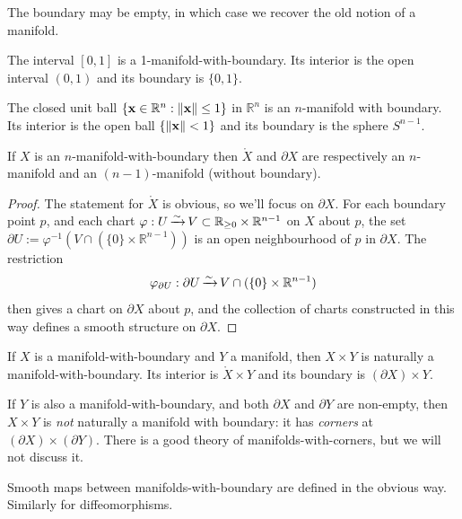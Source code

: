 \documentclass[a4paper,11pt]{article}
\begin{document}
	\begin{rmk}
		The boundary may be empty, in which case we recover the old notion of a manifold.
	\end{rmk}

	\begin{ex}
		The interval $[0,1]$ is a 1-manifold-with-boundary. Its interior is the open interval $(0,1)$ and its boundary is $\{0,1\}$.
	\end{ex}

	\begin{ex}
		The closed unit ball $\{\vb x \in \mathbb{R}^n : \norm{\vb x} \leq 1\}$ in $\mathbb{R}^n$ is an $n$-manifold with boundary. Its interior is the open ball $\{\norm{\vb x}<1\}$ and its boundary is the sphere $S ^{n-1}$.
	\end{ex}

	\begin{prop}
		If $X$ is an $n$-manifold-with-boundary then $\mathring{X}$ and $\partial X$ are respectively an $n$-manifold and an $(n-1)$-manifold (without boundary).
	\end{prop}

	\begin{proof}
		The statement for $\mathring{X}$ is obvious, so we'll focus on $\partial X$. For each boundary point $p$, and each chart $\varphi: U \operatorname{\xrightarrow{\sim}} V \subset \mathbb{R}_{\geq 0}\times \mathbb{R}^{n-1}$ on $X$ about $p$, the set $\partial U := \varphi^{-1} (V\cap (\{0\} \times \mathbb{R}^{n-1}))$ is an open neighbourhood of $p$ in $\partial X$. The restriction
		\[
			\varphi _{\partial U}: \partial U \operatorname{\xrightarrow{\sim}} V \cap (\{0\}\times \mathbb{R}^{n-1})
		\]
		then gives a chart on $\partial X$ about $p$, and the collection of charts constructed in this way defines a smooth structure on $\partial X$. 
	\end{proof}

	\begin{ex}
		If $X$ is a manifold-with-boundary and $Y$ a manifold, then $X \times Y$ is naturally a manifold-with-boundary. Its interior is $\mathring{X}\times Y$ and its boundary is $(\partial X)\times Y$.
		
		If $Y$ is also a manifold-with-boundary, and both $\partial X$ and $\partial Y$ are non-empty, then $X\times Y$ is \emph{not} naturally a manifold with boundary: it has \emph{corners} at $(\partial X)\times (\partial Y)$. There is a good theory of manifolds-with-corners, but we will not discuss it. 
	\end{ex}

	Smooth maps between manifolds-with-boundary are defined in the obvious way. Similarly for diffeomorphisms.
\end{document}

